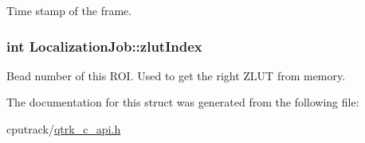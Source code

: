 Time stamp of the frame. 

\subsubsection[{\texorpdfstring{zlut\+Index}{zlutIndex}}]{\setlength{\rightskip}{0pt plus 5cm}int Localization\+Job\+::zlut\+Index}\hypertarget{struct_localization_job_afcf9f91b72597af0e2572f3ae74d9a99}{}\label{struct_localization_job_afcf9f91b72597af0e2572f3ae74d9a99}


Bead number of this R\+OI. Used to get the right Z\+L\+UT from memory. 



The documentation for this struct was generated from the following file\+:\begin{DoxyCompactItemize}
\item 
cputrack/\hyperlink{qtrk__c__api_8h}{qtrk\+\_\+c\+\_\+api.\+h}\end{DoxyCompactItemize}
